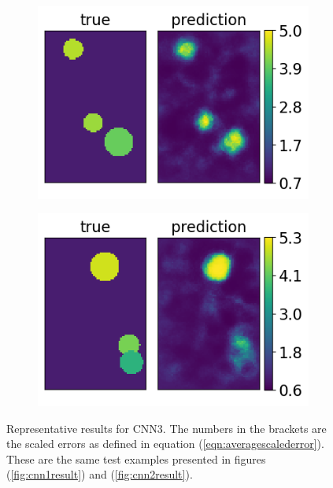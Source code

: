 \documentclass[12pt]{article}
\newcommand{\nhghalfwidth}{0.48\linewidth}
\newcommand{\nhgtotalheight}{4cm}
\begin{document}
\begin{figure}[!h]
  \centering
  \begin{subfigure}[c]{\nhghalfwidth}
    \centering
    \includegraphics[totalheight=\nhgtotalheight]{Figures/AppendixNew/CNN3/ex3/mu.png}
  \end{subfigure}
  \begin{subfigure}[c]{\nhghalfwidth}
    \centering
    \includegraphics[totalheight=\nhgtotalheight]{Figures/AppendixNew/CNN3/ex4/mu.png}
  \end{subfigure}
\caption{\label{fig:cnn3result} Representative results for CNN3. The numbers in the brackets are the scaled errors as defined in equation (\ref{eqn:averagescalederror}). These are the same test examples presented in figures (\ref{fig:cnn1result}) and (\ref{fig:cnn2result}).}  
\end{figure}
%
\end{document}
